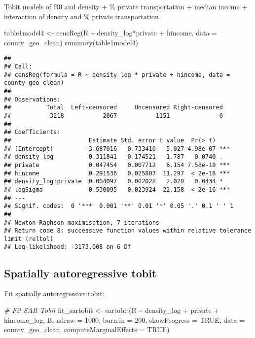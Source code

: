 \documentclass[10pt,letterpaper]{article}
\newenvironment{Shaded}{\begin{snugshade}}{\end{snugshade}}
\newcommand{\AttributeTok}[1]{\textcolor[rgb]{0.77,0.63,0.00}{#1}}
\newcommand{\CommentTok}[1]{\textcolor[rgb]{0.56,0.35,0.01}{\textit{#1}}}
\newcommand{\ConstantTok}[1]{\textcolor[rgb]{0.00,0.00,0.00}{#1}}
\newcommand{\DecValTok}[1]{\textcolor[rgb]{0.00,0.00,0.81}{#1}}
\newcommand{\FunctionTok}[1]{\textcolor[rgb]{0.00,0.00,0.00}{#1}}
\newcommand{\NormalTok}[1]{#1}
\newcommand{\OtherTok}[1]{\textcolor[rgb]{0.56,0.35,0.01}{#1}}
\newcommand{\SpecialCharTok}[1]{\textcolor[rgb]{0.00,0.00,0.00}{#1}}
\begin{document}
Tobit models of R0 and density + \% private transportation + median
income + interaction of density and \% private transportation

\begin{Shaded}
\begin{Highlighting}[]
\NormalTok{table1model4 }\OtherTok{\textless{}{-}} \FunctionTok{censReg}\NormalTok{(R }\SpecialCharTok{\textasciitilde{}}\NormalTok{ density\_log}\SpecialCharTok{*}\NormalTok{private }\SpecialCharTok{+}\NormalTok{ hincome, }
                    \AttributeTok{data =}\NormalTok{ county\_geo\_clean)}
\FunctionTok{summary}\NormalTok{(table1model4)}
\end{Highlighting}
\end{Shaded}

\begin{verbatim}
## 
## Call:
## censReg(formula = R ~ density_log * private + hincome, data = county_geo_clean)
## 
## Observations:
##          Total  Left-censored     Uncensored Right-censored 
##           3218           2067           1151              0 
## 
## Coefficients:
##                      Estimate Std. error t value  Pr(> t)    
## (Intercept)         -3.687016   0.733410  -5.027 4.98e-07 ***
## density_log          0.311841   0.174521   1.787   0.0740 .  
## private              0.047454   0.007712   6.154 7.58e-10 ***
## hincome              0.291536   0.025807  11.297  < 2e-16 ***
## density_log:private  0.004097   0.002028   2.020   0.0434 *  
## logSigma             0.530095   0.023924  22.158  < 2e-16 ***
## ---
## Signif. codes:  0 '***' 0.001 '**' 0.01 '*' 0.05 '.' 0.1 ' ' 1
## 
## Newton-Raphson maximisation, 7 iterations
## Return code 8: successive function values within relative tolerance limit (reltol)
## Log-likelihood: -3173.008 on 6 Df
\end{verbatim}

\hypertarget{spatially-autoregressive-tobit}{%
\subsection{Spatially autoregressive
tobit}\label{spatially-autoregressive-tobit}}

Fit spatially autoregressive tobit:

\begin{Shaded}
\begin{Highlighting}[]
\CommentTok{\# Fit SAR Tobit}
\NormalTok{fit\_sartobit }\OtherTok{\textless{}{-}} \FunctionTok{sartobit}\NormalTok{(R }\SpecialCharTok{\textasciitilde{}}\NormalTok{ density\_log }\SpecialCharTok{+}\NormalTok{ private }\SpecialCharTok{+}\NormalTok{ hincome\_log,}
\NormalTok{                         B,}
                         \AttributeTok{ndraw =} \DecValTok{1000}\NormalTok{,}
                         \AttributeTok{burn.in =} \DecValTok{200}\NormalTok{, }
                         \AttributeTok{showProgress =} \ConstantTok{TRUE}\NormalTok{,}
                         \AttributeTok{data =}\NormalTok{ county\_geo\_clean,}
                         \AttributeTok{computeMarginalEffects =} \ConstantTok{TRUE}\NormalTok{)}
\end{Highlighting}
\end{Shaded}
\end{document}
